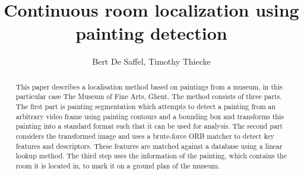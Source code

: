 \documentclass[10pt,final,journal]{IEEEtran}
\title{Continuous room localization using painting detection}
\author{Bert De Saffel, Timothy Thiecke}
\begin{document}
	\maketitle
	\begin{abstract}
		This paper describes a localisation method based on paintings from a museum, in this particular case The Museum of Fine Arts, Ghent. The method consists of three parts. The first part is painting segmentation which attempts to detect a painting from an arbitrary video frame using painting contours and a bounding box and transforms this painting into a standard format such that it can be used for analysis. The second part considers the transformed image and uses a brute-force ORB \cite{Rublee2011} matcher to detect key features and descriptors. These features are matched against a database using a linear lookup method. The third step uses the information of the painting, which contains the room it is located in, to mark it on a ground plan of the museum.

	\end{abstract}

	
	
	
	
	

	
	
\end{document}
